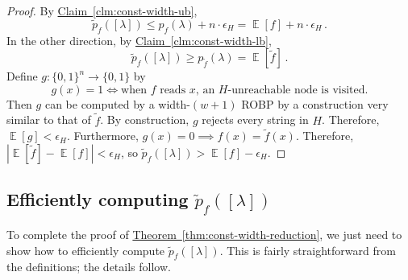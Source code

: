 \documentclass[10pt,a4paper]{article}
\DeclareMathOperator*{\ExpVal}{\mathbb E}
\newcommand{\expref}[2]{\hyperref[#2]{#1~\ref*{#2}}}
\begin{document}
\begin{proof}
By \expref{Claim}{clm:const-width-ub},
$$
\widetilde{p}_f([\lambda]) \leq p_f(\lambda) + n \cdot \epsilon_H = \ExpVal[f] + n \cdot \epsilon_H\,.
$$
In the other direction, by \expref{Claim}{clm:const-width-lb},
$$
\widetilde{p}_f([\lambda]) \geq p_{\widetilde{f}}(\lambda) = \ExpVal[\widetilde{f}]\,.
$$
Define $g \colon \{0, 1\}^n \to \{0, 1\}$ by
$$
g(x) = 1 \iff \text{when $f$ reads $x$, an $H$-unreachable node is visited}.
$$
Then $g$ can be computed by a width-$(w + 1)$ ROBP by a construction very similar to that of $\widetilde{f}$. By construction, $g$ rejects every string in $H$. Therefore, $\ExpVal[g] < \epsilon_H$. Furthermore, $g(x) = 0 \implies f(x) = \widetilde{f}(x)$. Therefore, $|\ExpVal[\widetilde{f}] - \ExpVal[f]| < \epsilon_H$, so $\widetilde{p}_f([\lambda]) > \ExpVal[f] - \epsilon_H$.
\end{proof}


\subsection{Efficiently computing $\widetilde{p}_f([\lambda])$} \label{sec:const-width-efficiency}

To complete the proof of \expref{Theorem}{thm:const-width-reduction}, we just need to show how to efficiently compute $\widetilde{p}_f([\lambda])$. This is fairly straightforward from the definitions; the details follow.
\end{document}
